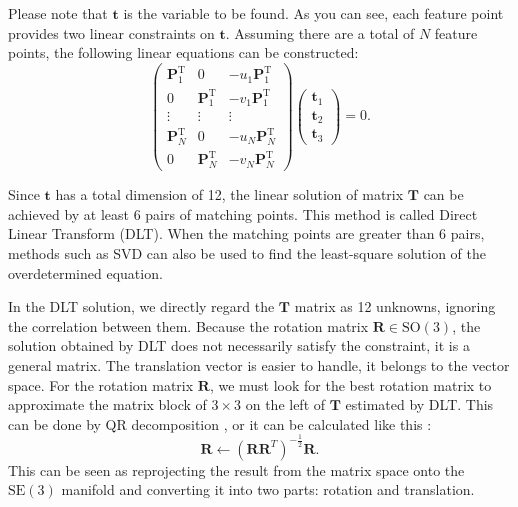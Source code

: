 Please note that $\mathbf{t}$ is the variable to be found. As you can see, each feature point provides two linear constraints on $\mathbf{t}$. Assuming there are a total of $N$ feature points, the following linear equations can be constructed:
\begin{equation}
\begin{pmatrix}
\mathbf{P}_{1}^{\mathrm{T}} & 0 & -u_{1}\mathbf{P}_{1}^{\mathrm{T}}	\\
0 & \mathbf{P}_{1}^{\mathrm{T}} & -v_{1}\mathbf{P}_{1}^{\mathrm{T}}	\\
\vdots & \vdots & \vdots			\\
\mathbf{P}_{N}^{\mathrm{T}} & 0 & -u_{N}\mathbf{P}_{N}^{\mathrm{T}} \\
0 & \mathbf{P}_{N}^{\mathrm{T}} & -v_{N}\mathbf{P}_{N}^{\mathrm{T}}
\end{pmatrix}
\begin{pmatrix}
\mathbf{t}_{1} \\ \mathbf{t}_{2} \\ \mathbf{t}_{3}
\end{pmatrix}
=0.
\end{equation}

Since $\mathbf{t}$ has a total dimension of 12, the linear solution of matrix $\mathbf{T}$ can be achieved by at least 6 pairs of matching points. This method is called Direct Linear Transform (DLT). When the matching points are greater than 6 pairs, methods such as SVD can also be used to find the least-square solution of the overdetermined equation.

In the DLT solution, we directly regard the $\mathbf{T}$ matrix as 12 unknowns, ignoring the correlation between them. Because the rotation matrix $\mathbf{R} \in \mathrm{SO}(3)$, the solution obtained by DLT does not necessarily satisfy the constraint, it is a general matrix. The translation vector is easier to handle, it belongs to the vector space. For the rotation matrix $\mathbf{R}$, we must look for the best rotation matrix to approximate the matrix block of $3 \times 3$ on the left of $\mathbf{T}$ estimated by DLT. This can be done by QR decomposition  {\cite{Hartley2003, Chen1994}}, or it can be calculated like this  {\cite{Barfoot2016,Green1952}}:
\begin{equation}
\mathbf{R} \leftarrow {\left( {\mathbf{R}{\mathbf{R}^T}} \right)^{ - \frac{1}{2}}} \mathbf{R}.
\end{equation}
This can be seen as reprojecting the result from the matrix space onto the $\mathrm{SE}(3)$ manifold and converting it into two parts: rotation and translation.

